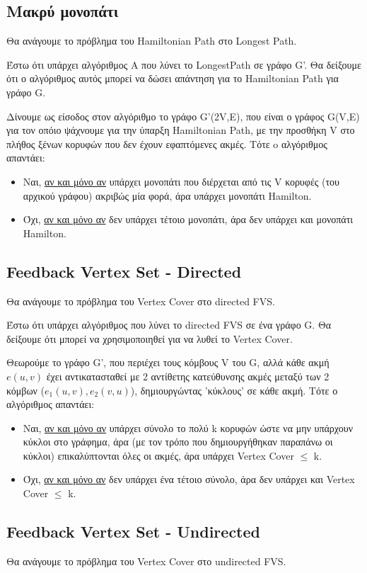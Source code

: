 \documentclass[a4paper,11pt]{article}
\begin{document}
\subsection{Μακρύ μονοπάτι}
Θα ανάγουμε το πρόβλημα του Hamiltonian Path στο Longest Path.

Έστω ότι υπάρχει αλγόριθμος Α που λύνει το LongestPath σε γράφο G'.
Θα δείξουμε ότι ο αλγόριθμος αυτός μπορεί να δώσει απάντηση για το Hamiltonian
Path για γράφο G.

Δίνουμε ως είσοδος στον αλγόριθμο το γράφο G'(2V,E), που είναι ο γράφος G(V,E)
για τον οπόιο ψάχνουμε για την ύπαρξη Hamiltonian Path, με την προσθήκη V στο
πλήθος ξένων κορυφών που δεν έχουν εφαπτόμενες ακμές.
Τότε o αλγόριθμος απαντάει:
\begin{itemize}
\item Ναι, \underline{αν και μόνο αν} υπάρχει μονοπάτι που διέρχεται από τις V
κορυφές (του αρχικού γράφου) ακριβώς μία φορά, άρα υπάρχει μονοπάτι Hamilton.
\item Όχι, \underline{αν και μόνο αν} δεν υπάρχει τέτοιο μονοπάτι, άρα δεν
υπάρχει και μονοπάτι Hamilton.
\end{itemize}

\subsection{Feedback Vertex Set - Directed}
Θα ανάγουμε το πρόβλημα του Vertex Cover στο directed FVS.

Έστω ότι υπάρχει αλγόριθμος που λύνει το directed FVS σε ένα γράφο G.
Θα δείξουμε ότι μπορεί να χρησιμοποιηθεί για να λυθεί το Vertex Cover.

Θεωρούμε το γράφο G', που περιέχει τους κόμβους V του G, αλλά κάθε ακμή
$e(u,v)$ έχει αντικατασταθεί με 2 αντίθετης κατεύθυνσης ακμές μεταξύ των 2
κόμβων ($e_1(u,v), e_2(v,u)$), δημιουργώντας 'κύκλους' σε κάθε ακμή.
Τότε ο αλγόριθμος απαντάει:
\begin{itemize}
\item Ναι, \underline{αν και μόνο αν} υπάρχει σύνολο το πολύ k κορυφών ώστε να
μην υπάρχουν κύκλοι στο γράφημα, άρα (με τον τρόπο που δημιουργήθηκαν παραπάνω
οι κύκλοι) επικαλύπτονται όλες οι ακμές, άρα υπάρχει Vertex Cover $\leq$ k.
\item Όχι, \underline{αν και μόνο αν} δεν υπάρχει ένα τέτοιο σύνολο, άρα δεν
υπάρχει και Vertex Cover $\leq$ k.
\end{itemize}

\subsection{Feedback Vertex Set - Undirected}
Θα ανάγουμε το πρόβλημα του Vertex Cover στο undirected FVS.
\end{document}
